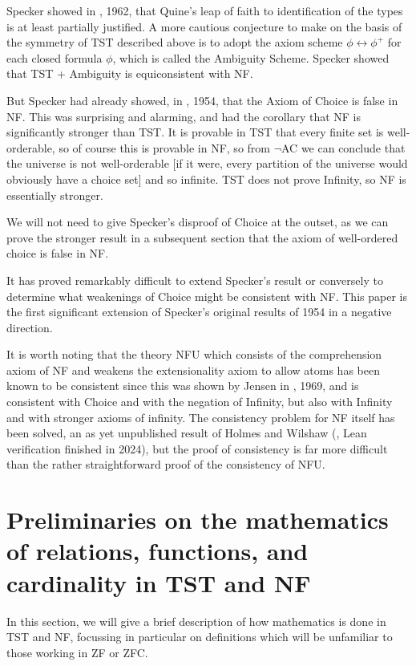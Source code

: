 \documentclass[12pt]{article}
\begin{document}
Specker showed in \cite{speckeramb}, 1962, that Quine's leap of faith to identification of the types is at least partially justified.  A more cautious conjecture to make on the basis of the symmetry of TST described above
is to adopt the axiom scheme $\phi \leftrightarrow \phi^+$ for each closed formula $\phi$, which is called the Ambiguity Scheme.  Specker showed that TST + Ambiguity is equiconsistent with NF.

But Specker had already showed, in \cite{speckernotac}, 1954, that the Axiom of Choice is false in NF.  This was surprising and alarming, and had the corollary that NF is significantly stronger than TST.  It is provable in TST that every finite set is well-orderable, so of course this is provable in NF, so from $\neg$AC we can conclude that the universe is not well-orderable [if it were, every partition of the universe would obviously have a choice set] and so infinite.   TST does not prove Infinity, so NF is essentially stronger.

We will not need to give Specker's disproof of Choice at the outset, as we can prove the stronger result in a subsequent section that the axiom of well-ordered choice is false in NF.

It has proved remarkably difficult to extend Specker's result or conversely to determine what weakenings of Choice might be consistent with NF.  This paper is the first significant extension of Specker's original results of 1954 in a negative direction.

It is worth noting that the theory NFU which consists of the comprehension axiom of NF and weakens the extensionality axiom to allow atoms has been known to be consistent since this was shown by Jensen
in \cite{jensen}, 1969, and is consistent with Choice and with the negation of Infinity, but also with Infinity and with stronger axioms of infinity.  The consistency problem for NF itself has been solved,
an as yet unpublished result of Holmes and Wilshaw (\cite{nfproof}, Lean verification finished in 2024), but the proof of consistency is far more difficult than the rather straightforward proof of the consistency of NFU.


\section{Preliminaries on the mathematics of relations, functions, and cardinality in TST and NF}

In this section, we will give a brief description of how mathematics is done in TST and NF, focussing in particular on definitions which will be unfamiliar to those working in ZF or ZFC.
\end{document}
